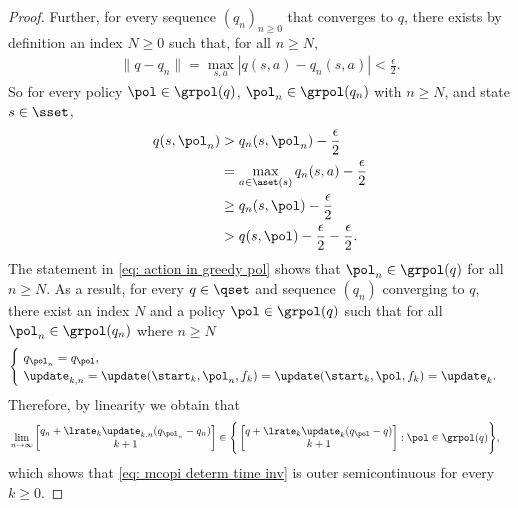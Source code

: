 \begin{proof}
Further, for every sequence $(q_n)_{n \geq 0}$ that converges to $q$, there exists by definition an index $N \geq 0$ such that, for all $n \geq N$,
\begin{align*}
    \|q - q_n\| = \max_{s,a} | q(s,a) - q_n(s,a) | < \frac{\epsilon}{2} .
\end{align*}
So for every policy $\pol \in \grpol(q)$, $\pol_n \in \grpol(q_n)$ with $n \geq N$, and state $s \in \sset$,
\begin{align}
    \nonumber
    q(s, \pol_n)
    &> q_n(s, \pol_n) - \frac{\epsilon}{2}
    \\
    \nonumber
    &= \max_{a \in \aset(s)} q_n(s, a) - \frac{\epsilon}{2}
    \\
    \nonumber
    &\geq q_n(s, \pol) - \frac{\epsilon}{2}
    \\
    \label{eq: poln in greedy pol}
    &> q(s, \pol) - \frac{\epsilon}{2} - \frac{\epsilon}{2} .
\end{align}
The statement in \eqref{eq: action in greedy pol} shows that $\pol_n \in \grpol(q)$ for all $n \geq N$. 
As a result, for every $q \in \qset$ and sequence $(q_n)$ converging to $q$,
there exist an index $N$ and a policy $\pol \in \grpol(q)$ such that for all  $\pol_n \in \grpol(q_n)$ where $n \geq N$
\begin{align*}
    \begin{cases}
        \ q_{\pol_n} = q_\pol ,
        \\
        \ \update_{k, n} = \update(\start_k, \pol_n, f_k) = \update(\start_k, \pol, f_k) = \update_k .
    \end{cases}
\end{align*}
Therefore, by linearity we obtain that
\begin{align*}
    &\lim_{n \to \infty}
    \begin{bmatrix}
        q_n + \lrate_k \update_{k,n} ( q_{\pol_n} - q_n )
        \\
        k +1
    \end{bmatrix}
    \in
    \Bigg\{ 
    \begin{bmatrix}
        q + \lrate_k \update_k ( q_{\pol} - q )
        \\
        k +1
    \end{bmatrix}
    :
    \pol \in \grpol(q) \Bigg\} ,
\end{align*}
which shows that \eqref{eq: mcopi determ time inv} is outer semicontinuous for every $k \geq 0$.
\end{proof}

